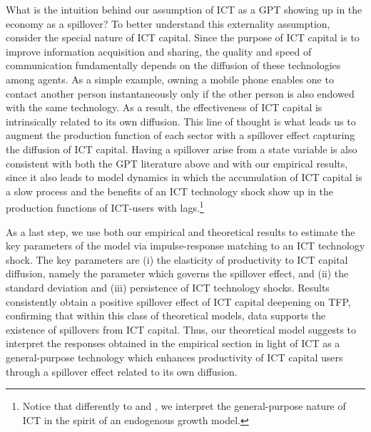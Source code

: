 \documentclass[12pt]{article}
\begin{document}
What is the intuition behind our assumption of ICT as a GPT showing up in the economy as a spillover? To better understand this externality assumption, consider the special nature of ICT capital. Since the purpose of ICT capital is to improve information acquisition and sharing, the quality and speed of communication fundamentally depends on the diffusion of these technologies among agents. As a simple example, owning a mobile phone enables one to contact another person instantaneously only if the other person is also endowed with the same technology. As a result, the effectiveness of ICT capital is intrinsically related to its own diffusion. This line of thought is what leads us to augment the production function of each sector with a spillover effect capturing the diffusion of ICT capital.  Having a spillover arise from a state variable is also consistent with both the GPT literature above and with our empirical results, since it also leads to model dynamics in which the accumulation of ICT capital is a slow process and the benefits of an ICT technology shock show up in the production functions of ICT-users with lags.\footnote{Notice that differently to \cite{basu2003case} and \cite{basu2007information}, we interpret the general-purpose nature of ICT in the spirit of an endogenous growth model.}

As a last step, we use both our empirical and theoretical results to estimate the key parameters of the model via impulse-response matching to an ICT technology shock. The key parameters are (i) the elasticity of productivity to ICT capital diffusion, namely the parameter which governs the spillover effect, and (ii) the standard deviation and (iii) persistence of ICT technology shocks. Results consistently obtain a positive spillover effect of ICT capital deepening on TFP, confirming that within this class of theoretical models, data supports the existence of spillovers from ICT capital. Thus, our theoretical model suggests to interpret the responses obtained in the empirical section in light of ICT as a general-purpose technology which enhances productivity of ICT capital users through a spillover effect related to its own diffusion.
\end{document}
